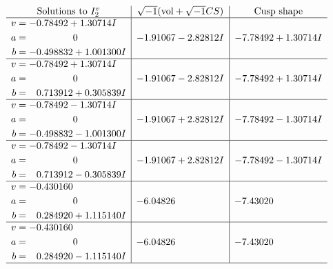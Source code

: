 \documentclass[1p]{elsarticle_modified}
\theoremstyle{definition}
\newcommand{\I}{\sqrt{-1}}
\begin{document}
$$\begin{array}{c|c|c}  
\text{Solutions to }I^v_{2}& \I (\text{vol} + \sqrt{-1}CS) & \text{Cusp shape}\\
 \hline 
\begin{aligned}
v &= -0.78492 + 1.30714 I \\
a &= \phantom{-0.000000 } 0 \\
b &= -0.498832 + 1.001300 I\end{aligned}
 & -1.91067 - 2.82812 I & -7.78492 + 1.30714 I \\ \hline\begin{aligned}
v &= -0.78492 + 1.30714 I \\
a &= \phantom{-0.000000 } 0 \\
b &= \phantom{-}0.713912 + 0.305839 I\end{aligned}
 & -1.91067 - 2.82812 I & -7.78492 + 1.30714 I \\ \hline\begin{aligned}
v &= -0.78492 - 1.30714 I \\
a &= \phantom{-0.000000 } 0 \\
b &= -0.498832 - 1.001300 I\end{aligned}
 & -1.91067 + 2.82812 I & -7.78492 - 1.30714 I \\ \hline\begin{aligned}
v &= -0.78492 - 1.30714 I \\
a &= \phantom{-0.000000 } 0 \\
b &= \phantom{-}0.713912 - 0.305839 I\end{aligned}
 & -1.91067 + 2.82812 I & -7.78492 - 1.30714 I \\ \hline\begin{aligned}
v &= -0.430160\phantom{ +0.000000I} \\
a &= \phantom{-0.000000 } 0 \\
b &= \phantom{-}0.284920 + 1.115140 I\end{aligned}
 & -6.04826\phantom{ +0.000000I} & -7.43020\phantom{ +0.000000I} \\ \hline\begin{aligned}
v &= -0.430160\phantom{ +0.000000I} \\
a &= \phantom{-0.000000 } 0 \\
b &= \phantom{-}0.284920 - 1.115140 I\end{aligned}
 & -6.04826\phantom{ +0.000000I} & -7.43020\phantom{ +0.000000I}\\
 \hline 
 \end{array}$$\newpage
\newpage\renewcommand{\arraystretch}{1}
\end{document}

